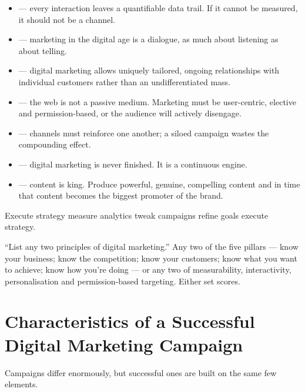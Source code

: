 \documentclass{MMTextbook}
\begin{document}
\begin{itemize}
\item {} --- every interaction leaves a quantifiable data
      trail. If it cannot be measured, it should not be a channel.
\item {} --- marketing in the digital age is a dialogue, as
      much about listening as about telling.
\item {} --- digital marketing allows uniquely tailored,
      ongoing relationships with individual customers rather than an
      undifferentiated mass.
\item {} --- the web is not a passive medium.
      Marketing must be user-centric, elective and permission-based, or the
      audience will actively disengage.
\item {} --- channels must reinforce one another; a siloed
      campaign wastes the compounding effect.
\item {} --- digital marketing is never finished. It is a
      continuous engine.
\item {} --- content is king. Produce powerful, genuine,
      compelling content and in time that content becomes the biggest promoter
      of the brand.
\end{itemize}

\begin{frameworkbox}
Execute strategy \ra{} measure analytics \ra{} tweak campaigns \ra{} refine
goals \ra{} execute strategy.
\end{frameworkbox}

\begin{exambox}
``List any two principles of digital marketing.''
Any two of the five pillars --- know your business; know the competition; know
your customers; know what you want to achieve; know how you're doing --- or any
two of measurability, interactivity, personalisation and permission-based
targeting. Either set scores.
\end{exambox}

\section{Characteristics of a Successful Digital Marketing Campaign}

Campaigns differ enormously, but successful ones are built on the same few
elements.
\end{document}
